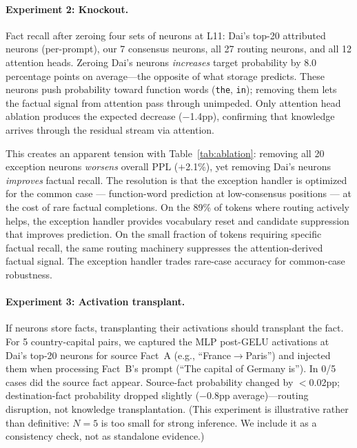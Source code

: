 \documentclass{article}
\begin{document}
\paragraph{Experiment 2: Knockout.}
Fact recall after zeroing four sets of neurons at L11:
Dai's top-20 attributed neurons (per-prompt), our 7 consensus neurons,
all 27 routing neurons, and all 12 attention heads.
Zeroing Dai's neurons \emph{increases} target probability by 8.0 percentage
points on average---the opposite of what storage predicts.
These neurons push probability toward function words (\texttt{the}, \texttt{in});
removing them lets the factual signal from attention pass through unimpeded.
Only attention head ablation produces the expected decrease ($-$1.4pp),
confirming that knowledge arrives through the residual stream via attention.

This creates an apparent tension with Table~\ref{tab:ablation}: removing all 20 exception neurons \emph{worsens} overall PPL ($+$2.1\%), yet removing Dai's neurons \emph{improves} factual recall. The resolution is that the exception handler is optimized for the common case --- function-word prediction at low-consensus positions --- at the cost of rare factual completions. On the 89\% of tokens where routing actively helps, the exception handler provides vocabulary reset and candidate suppression that improves prediction. On the small fraction of tokens requiring specific factual recall, the same routing machinery suppresses the attention-derived factual signal. The exception handler trades rare-case accuracy for common-case robustness.

\paragraph{Experiment 3: Activation transplant.}
If neurons store facts, transplanting their activations should transplant the
fact.
For 5 country-capital pairs, we captured the MLP post-GELU activations at Dai's
top-20 neurons for source Fact~A (e.g., ``France$\to$Paris'') and injected them
when processing Fact~B's prompt (``The capital of Germany is'').
In 0/5 cases did the source fact appear.
Source-fact probability changed by $<$0.02pp; destination-fact probability
dropped slightly ($-$0.8pp average)---routing disruption, not knowledge
transplantation.
(This experiment is illustrative rather than definitive: $N = 5$ is
too small for strong inference. We include it as a consistency check,
not as standalone evidence.)
\end{document}
